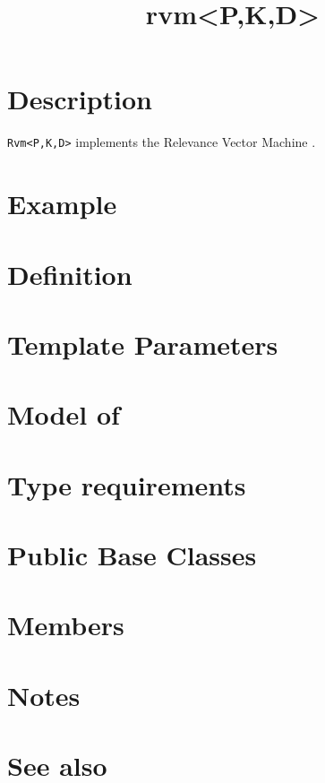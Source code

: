 \documentclass{article}
\begin{document}
\title{rvm<P,K,D>}
\maketitle

\section*{Description}

\texttt{Rvm<P,K,D>} implements the Relevance Vector Machine \cite{tipping03fast}.


\section*{Example}
\section*{Definition}
\section*{Template Parameters}
\section*{Model of}
\section*{Type requirements}
\section*{Public Base Classes}
\section*{Members}
\section*{Notes}
\section*{See also}



\end{document}
